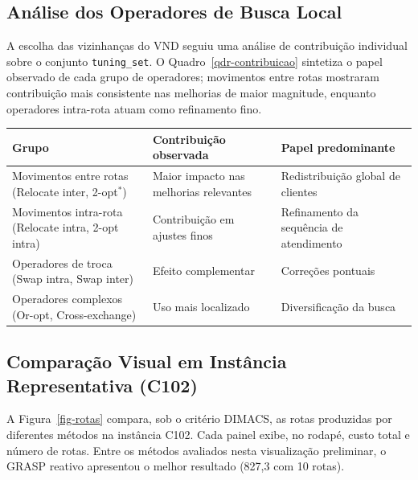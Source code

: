 \documentclass[10pt, a4paper]{article}
\begin{document}
\subsection{An\'alise dos Operadores de Busca Local}

A escolha das vizinhan\c{c}as do VND seguiu uma an\'alise de contribui\c{c}\~ao individual sobre o conjunto \texttt{tuning\_set}. O Quadro~\ref{qdr-contribuicao} sintetiza o papel observado de cada grupo de operadores; movimentos entre rotas mostraram contribui\c{c}\~ao mais consistente nas melhorias de maior magnitude, enquanto operadores intra-rota atuam como refinamento fino.

\begin{quadro}[H]
\centering
\caption{Contribui\c{c}\~ao qualitativa dos grupos de operadores no VND}
\label{qdr-contribuicao}
\small
\begin{tabular}{|p{45mm}|p{55mm}|p{45mm}|}
\hline
\rowcolor{gray!20}\textbf{Grupo} & \textbf{Contribui\c{c}\~ao observada} & \textbf{Papel predominante} \\
\hline
Movimentos entre rotas (Relocate inter, 2-opt$^*$) & Maior impacto nas melhorias relevantes & Redistribui\c{c}\~ao global de clientes \\
\hline
Movimentos intra-rota (Relocate intra, 2-opt intra) & Contribui\c{c}\~ao em ajustes finos & Refinamento da sequ\^encia de atendimento \\
\hline
Operadores de troca (Swap intra, Swap inter) & Efeito complementar & Corre\c{c}\~oes pontuais \\
\hline
Operadores complexos (Or-opt, Cross-exchange) & Uso mais localizado & Diversifica\c{c}\~ao da busca \\
\hline
\end{tabular}
\end{quadro}

\subsection{Compara\c{c}\~ao Visual em Inst\^ancia Representativa (C102)}

A Figura~\ref{fig-rotas} compara, sob o crit\'erio DIMACS, as rotas produzidas por diferentes m\'etodos na inst\^ancia C102. Cada painel exibe, no rodap\'e, custo total e n\'umero de rotas. Entre os m\'etodos avaliados nesta visualiza\c{c}\~ao preliminar, o GRASP reativo apresentou o melhor resultado (827{,}3 com 10 rotas).
\end{document}
